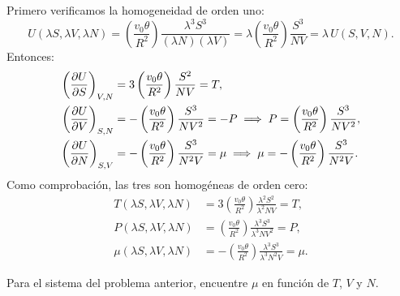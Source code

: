 \begin{solucion}
  Primero verificamos la homogeneidad de orden uno:
  \begin{equation*}
    U(\lambda S,\lambda V,\lambda N)=\left(\frac{v_0\theta}{R^{2}}\right)\frac{\lambda^{3}S^{3}}{(\lambda N)(\lambda V)}
    =\lambda\left(\frac{v_0\theta}{R^{2}}\right)\frac{S^{3}}{NV}=\lambda\,U(S,V,N).
  \end{equation*}
  Entonces:
  \begin{align*}
    \left(\frac{\partial U}{\partial S}\right)_{V,N}&=3\left(\frac{v_0\theta}{R^{2}}\right)\frac{S^{2}}{NV}=T,\\
    \left(\frac{\partial U}{\partial V}\right)_{S,N}&=-\left(\frac{v_0\theta}{R^{2}}\right)\frac{S^{3}}{NV^{2}}=-P
      \;\Longrightarrow\;P=\left(\frac{v_0\theta}{R^{2}}\right)\frac{S^{3}}{NV^{2}},\\
    \left(\frac{\partial U}{\partial N}\right)_{S,V}&=-\left(\frac{v_0\theta}{R^{2}}\right)\frac{S^{3}}{N^{2}V}=\mu
      \;\Longrightarrow\;\mu=-\left(\frac{v_0\theta}{R^{2}}\right)\frac{S^{3}}{N^{2}V}.
  \end{align*}
  Como comprobación, las tres son homogéneas de orden cero:
  \begin{align*}
    T(\lambda S,\lambda V,\lambda N)&=3\left(\frac{v_0\theta}{R^{2}}\right)\frac{\lambda^{2}S^{2}}{\lambda^{2}NV}=T,\\
    P(\lambda S,\lambda V,\lambda N)&=\left(\frac{v_0\theta}{R^{2}}\right)\frac{\lambda^{3}S^{3}}{\lambda^{3}NV^{2}}=P,\\
    \mu(\lambda S,\lambda V,\lambda N)&=-\left(\frac{v_0\theta}{R^{2}}\right)\frac{\lambda^{3}S^{3}}{\lambda^{3}N^{2}V}=\mu.
  \end{align*}
\end{solucion}

\begin{ejercicio}
  Para el sistema del problema anterior, encuentre $\mu$ en función de $T$, $V$ y $N$.
\end{ejercicio}

